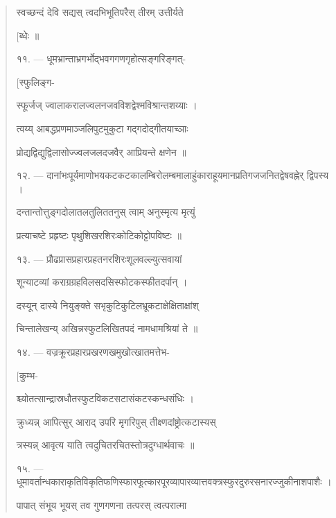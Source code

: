\documentclass[a4paper, 11pt, oneside, french]{article}
\begin{document}
\begin{quotation}
\texthindi{स्वच्छन्दं देवि सद्यस् त्वदभिभूतिपरैस् तीरम् उत्तीर्यते}

\hspace*{65mm}\texthindi{[ब्धेः ॥}

\bigskip

\texthindi{११}. --- \texthindi{धूमभ्रान्ताभ्रगर्भोद्भवगगणगृहोत्सङ्गरिङ्गत्-}

\hspace*{65mm}\texthindi{[स्फुलिङ्ग-}

\texthindi{स्फूर्जज् ज्वालाकरालज्वलनजवविशद्वेश्मविश्रान्तशय्याः ।}

\texthindi{त्वय्य् आबद्धप्रणमाञ्जलिपुटमुकुटा गद्गदोद्गीतयाच्ञाः}

\texthindi{प्रोद्यद्विद्युद्विलासोज्ज्वलजलदजवैर् आप्रियन्ते क्षणेन ॥}

\bigskip

\texthindi{१२}. --- \texthindi{दानांभःपूर्यमाणोभयकटकटकालम्बिरोलम्बमालाहुंकाराहूयमानप्रतिगजजनितद्वेषवह्नेर् द्विपस्य ।}

\texthindi{दन्तान्तोत्तुङ्गदोलातलतुलिततनुस् त्वाम् अनुस्मृत्य मृत्युं}

\texthindi{प्रत्याचष्टे प्रहृष्टः पृथुशिखरशिरःकोटिकोट्टोपविष्टः ॥}

\bigskip

\texthindi{१३}. --- \texthindi{प्रौढप्रासप्रहारप्रहतनरशिरःशूलवल्ल्युत्सवायां}

\texthindi{शून्याटव्यां कराग्रग्रहविलसदसिस्फोटकस्फीतदर्पान् ।}

\texthindi{दस्यून् दास्ये नियुङ्क्ते सभृकुटिकुटिलभ्रूकटाक्षेक्षिताक्षांश्}

\texthindi{चिन्तालेखन्य् अखिन्नस्फुटलिखितपदं नामधामश्रियां ते ॥}

\bigskip

\texthindi{१४}. --- \texthindi{वज्रक्रूरप्रहारप्रखरणखमुखोत्खातमत्तेभ-}

\hspace*{65mm}\texthindi{[कुम्भ-}

\texthindi{श्च्योतत्सान्द्रास्रधौतस्फुटविकटसटासंकटस्कन्धसंधिः ।}

\texthindi{क्रुध्यन्न् आपित्सुर् आराद् उपरि मृगरिपुस् तीक्ष्णदांष्ट्रोत्कटास्यस्}

\texthindi{त्रस्यन्न् आवृत्य याति त्वदुचितरचितस्तोत्रदुग्धार्थवाचः ॥}

\bigskip

\texthindi{१५}. --- \texthindi{धूमावर्तान्धकाराकृतिविकृतिफणिस्फारफूत्कारपूरव्यापारव्यात्तवक्त्रस्फुरदुरुरसनारज्जुकीनाशपाशैः ।}

\texthindi{पापात् संभूय भूयस् तव गुणगणना तत्परस् त्वत्परात्मा}


\end{quotation}
\end{document}
